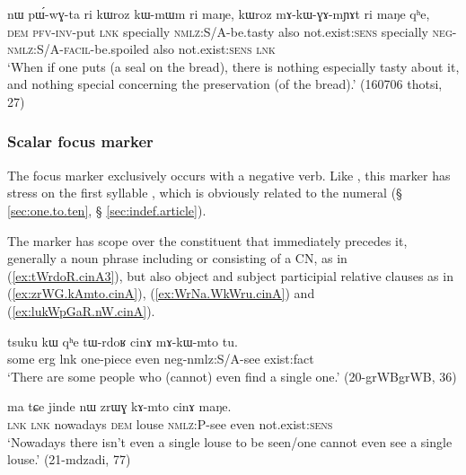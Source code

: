  \begin{exe}
\ex \label{ex:ri.kWmWm.ri}
 \gll   nɯ pɯ́-wɣ-ta ri  kɯroz kɯ-mɯm ri maŋe, kɯroz mɤ-kɯ-ɣɤ-mɲɤt ri maŋe qʰe, \\
 \textsc{dem} \textsc{pfv}-\textsc{inv}-put \textsc{lnk} specially \textsc{nmlz}:S/A-be.tasty also not.exist:\textsc{sens} specially \textsc{neg}-\textsc{nmlz}:S/A-\textsc{facil}-be.spoiled also not.exist:\textsc{sens} \textsc{lnk} \\
 \glt `When if one puts (a seal on the bread), there is nothing especially tasty about it, and nothing special concerning the preservation (of the bread).' (160706 thotsi, 27)
  \end{exe}
  

  
 \subsubsection{Scalar focus marker } \label{sec:cinA} 
 The focus marker  exclusively occurs with a negative verb. Like , this marker has stress on the first syllable , which is obviously related to the numeral  (§ \ref{sec:one.to.ten}, § \ref{sec:indef.article}).
 
 The marker  has scope over the constituent that immediately precedes it, generally a noun phrase including or consisting of a CN, as in (\ref{ex:tWrdoR.cinA3}), but also object and subject participial relative clauses as in (\ref{ex:zrWG.kAmto.cinA}), (\ref{ex:WrNa.WkWru.cinA}) and (\ref{ex:lukWpGaR.nW.cinA}).
 
 \begin{exe}
\ex \label{ex:tWrdoR.cinA3}
\gll tsuku kɯ qʰe tɯ-rdoʁ cinɤ mɤ-kɯ-mto tu. \\
some erg lnk one-piece even neg-nmlz:S/A-see exist:fact \\
\glt `There are some people who (cannot) even find a single one.' (20-grWBgrWB, 36)
 \end{exe} 

 \begin{exe}
\ex \label{ex:zrWG.kAmto.cinA}
\gll  ma tɕe jinde nɯ zrɯɣ kɤ-mto cinɤ maŋe. \\
\textsc{lnk} \textsc{lnk} nowadays \textsc{dem} louse \textsc{nmlz:P}-see even not.exist:\textsc{sens} \\
\glt `Nowadays there isn't even a single louse to be seen/one cannot even see a single louse.' (21-mdzadi, 77)
\end{exe} 

